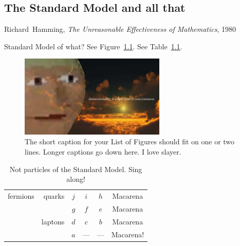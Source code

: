 \begin{singlespacing}
\chapter{The Standard Model and all that}
\label{chapter:theory}
%
\begin{epigraphs}
%
{Richard~Hamming,
\textit{The Unreasonable Effectiveness of Mathematics},
1980~\cite{hamming1980unreasonable}}
\end{epigraphs}
\end{singlespacing}
\noindent
Standard Model of what? See Figure~\ref{fig:theory_slayer}.
See Table~\ref{tab:theory_particles}.

\begin{figure}[tp]
\centering
\includegraphics[width=0.618\textwidth]{figures/slayer.jpg}
\caption[
The short caption for your List of Figures
]{%
The short caption for your List of Figures should fit on one or two lines.
Longer captions go down here. I love slayer.%
}
\label{fig:theory_slayer}
\end{figure}

\begin{table}[tp]
\centering
\begin{tabular}{rrcccc}
fermions & quarks  & $j$ & $i$ & $h$ & Macarena\hphantom{!} \\
         &         & $g$ & $f$ & $e$ & Macarena\hphantom{!} \\[1ex]
         & laptons & $d$ & $c$ & $b$ & Macarena\hphantom{!} \\
         &         & $a$ & --- & --- & Macarena! \\
\end{tabular}
\caption[
Not particles of the Standard Model
]{%
Not particles of the Standard Model.
Sing along!%
}
\label{tab:theory_particles}
\end{table}

